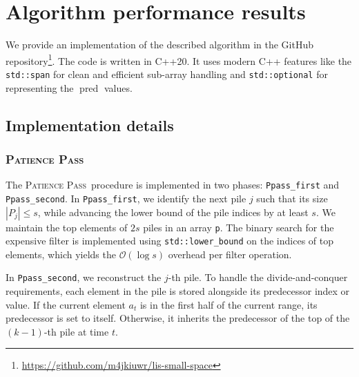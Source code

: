 \documentclass[lic, english, shortabstract]{iithesis}
\theoremstyle{plain}
\newcommand{\Ppass}{\textsc{Patience Pass}}
\theoremstyle{definition}
\begin{document}


\section{Algorithm performance results}
We provide an implementation of the described algorithm in the GitHub repository\footnote{\url{https://github.com/m4jkiuwr/lis-small-space}}. 
The code is written in C++20. It uses modern C++ features like the \texttt{std::span} for clean and efficient sub-array handling and \texttt{std::optional} for representing the $\operatorname{pred}$ values.

\subsection{Implementation details}

\subsubsection{\Ppass}
The \Ppass\ procedure is implemented in two phases: \texttt{Ppass\_first} and \texttt{Ppass\_second}. 
In \texttt{Ppass\_first}, we identify the next pile $j$ such that its size $|P_j| \leq s$, while advancing the lower bound of the pile indices by at least $s$. 
\newline
We maintain the top elements of $2s$ piles in an array \texttt{p}. The binary search for the expensive filter is implemented using \texttt{std::lower\_bound} on the indices of top elements, which yields the $\mathcal{O}(\log s)$ overhead per filter operation.

In \texttt{Ppass\_second}, we reconstruct the $j$-th pile. To handle the divide-and-conquer requirements, each element in the pile is stored alongside its predecessor index or value. 
If the current element $a_t$ is in the first half of the current range, its predecessor is set to itself. 
Otherwise, it inherits the predecessor of the top of the $(k-1)$-th pile at time $t$.
\end{document}
